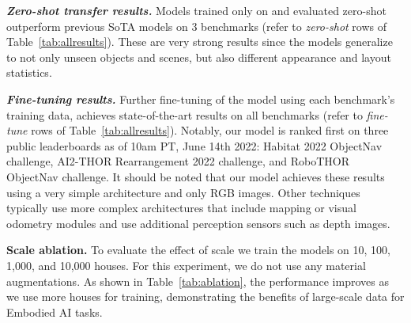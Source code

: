 \noindent \textbf{\emph{Zero-shot transfer results.}} Models trained only on \env and evaluated zero-shot outperform previous SoTA models on 3 benchmarks (refer to \emph{zero-shot} rows of Table~\ref{tab:allresults}). These are very strong results since the models generalize to not only unseen objects and scenes, but also different appearance and layout statistics.

\noindent \textbf{\emph{Fine-tuning results.}} Further fine-tuning of the model using each benchmark's training data, achieves state-of-the-art results on all benchmarks (refer to \emph{fine-tune} rows of Table~\ref{tab:allresults}). Notably, our model is ranked first on three public leaderboards as of 10am PT, June 14th 2022: Habitat 2022 ObjectNav challenge, AI2-THOR Rearrangement 2022 challenge, and RoboTHOR ObjectNav challenge. It should be noted that our model achieves these results using a very simple architecture and only RGB images. Other techniques typically use more complex architectures that include mapping or visual odometry modules and use additional perception sensors such as depth images.

\noindent \textbf{Scale ablation.} To evaluate the effect of scale we train the models on 10, 100, 1,000, and 10,000 houses. For this experiment, we do not use any material augmentations. As shown in Table~\ref{tab:ablation}, the performance improves as we use more houses for training, demonstrating the benefits of large-scale data for Embodied AI tasks.






